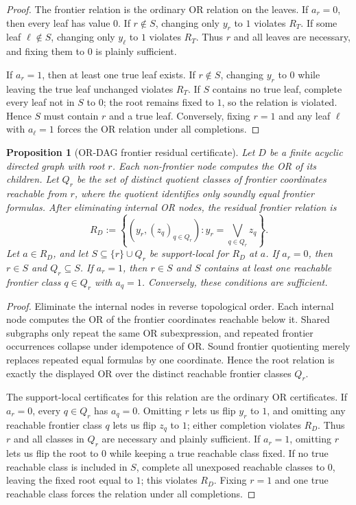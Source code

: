 \documentclass[11pt]{article}
\newtheorem{proposition}[theorem]{Proposition}
\theoremstyle{definition}
\begin{document}
\begin{proof}
The frontier relation is the ordinary OR relation on the leaves.  If \(a_r=0\), then every leaf has value \(0\).  If \(r\notin S\), changing only \(y_r\) to \(1\) violates \(R_T\).  If some leaf \(\ell\notin S\), changing only \(y_\ell\) to \(1\) violates \(R_T\).  Thus \(r\) and all leaves are necessary, and fixing them to \(0\) is plainly sufficient.

If \(a_r=1\), then at least one true leaf exists.  If \(r\notin S\), changing \(y_r\) to \(0\) while leaving the true leaf unchanged violates \(R_T\).  If \(S\) contains no true leaf, complete every leaf not in \(S\) to \(0\); the root remains fixed to \(1\), so the relation is violated.  Hence \(S\) must contain \(r\) and a true leaf.  Conversely, fixing \(r=1\) and any leaf \(\ell\) with \(a_\ell=1\) forces the OR relation under all completions.
\end{proof}

\begin{proposition}[OR-DAG frontier residual certificate]\label{prop:or-dag-frontier-residual}
Let \(D\) be a finite acyclic directed graph with root \(r\).  Each non-frontier node computes the OR of its children.  Let \(Q_r\) be the set of distinct quotient classes of frontier coordinates reachable from \(r\), where the quotient identifies only soundly equal frontier formulas.  After eliminating internal OR nodes, the residual frontier relation is
\[
  R_D
  :=\left\{(y_r,(z_q)_{q\in Q_r}):
      y_r=\bigvee_{q\in Q_r} z_q\right\}.
\]
Let \(a\in R_D\), and let \(S\subseteq\{r\}\cup Q_r\) be support-local for \(R_D\) at \(a\).  If \(a_r=0\), then \(r\in S\) and \(Q_r\subseteq S\).  If \(a_r=1\), then \(r\in S\) and \(S\) contains at least one reachable frontier class \(q\in Q_r\) with \(a_q=1\).  Conversely, these conditions are sufficient.
\end{proposition}

\begin{proof}
Eliminate the internal nodes in reverse topological order.  Each internal node computes the OR of the frontier coordinates reachable below it.  Shared subgraphs only repeat the same OR subexpression, and repeated frontier occurrences collapse under idempotence of OR.  Sound frontier quotienting merely replaces repeated equal formulas by one coordinate.  Hence the root relation is exactly the displayed OR over the distinct reachable frontier classes \(Q_r\).

The support-local certificates for this relation are the ordinary OR certificates.  If \(a_r=0\), every \(q\in Q_r\) has \(a_q=0\).  Omitting \(r\) lets us flip \(y_r\) to \(1\), and omitting any reachable frontier class \(q\) lets us flip \(z_q\) to \(1\); either completion violates \(R_D\).  Thus \(r\) and all classes in \(Q_r\) are necessary and plainly sufficient.  If \(a_r=1\), omitting \(r\) lets us flip the root to \(0\) while keeping a true reachable class fixed.  If no true reachable class is included in \(S\), complete all unexposed reachable classes to \(0\), leaving the fixed root equal to \(1\); this violates \(R_D\).  Fixing \(r=1\) and one true reachable class forces the relation under all completions.
\end{proof}
\end{document}
